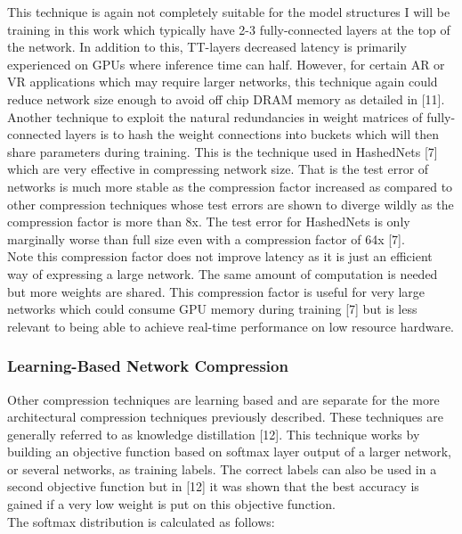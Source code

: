 \documentclass{article}
\begin{document}
This technique is again not completely suitable for the model structures I will be training in this work which typically have 2-3 fully-connected layers at the top of the network. In addition to this, TT-layers decreased latency is primarily experienced on GPUs where inference time can half. However, for certain AR or VR applications which may require larger networks, this technique again could reduce network size enough to avoid off chip DRAM memory as detailed in [11]. \\

Another technique to exploit the natural redundancies in weight matrices of fully-connected layers is to hash the weight connections into buckets which will then share parameters during training. This is the technique used in HashedNets [7] which are very effective in compressing network size. That is the test error of networks is much more stable as the compression factor increased as compared to other compression techniques whose test errors are shown to diverge wildly as the compression factor is more than 8x. The test error for HashedNets is only marginally worse than full size even with a compression factor of 64x [7].\\

Note this compression factor does not improve latency as it is just an efficient way of expressing a large network. The same amount of computation is needed but more weights are shared. This compression factor is useful for very large networks which could consume GPU memory during training [7] but is less relevant to being able to achieve real-time performance on low resource hardware. 

\subsubsection{Learning-Based Network Compression}
Other compression techniques are learning based and are separate for the more architectural compression techniques previously described. These techniques are generally referred to as knowledge distillation [12]. This technique works by building an objective function based on softmax layer output of a larger network, or several networks, as training labels. The correct labels can also be used in a second objective function but in [12] it was shown that the best accuracy is gained if a very low weight is put on this objective function.\\

The softmax distribution is calculated as follows:
\end{document}
